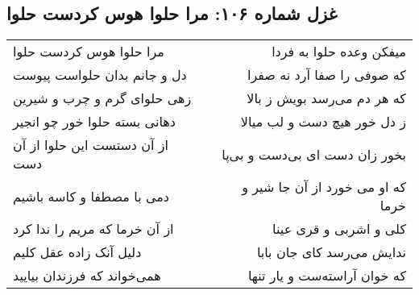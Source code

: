 \begin{center}
\section*{غزل شماره ۱۰۶: مرا حلوا هوس کردست حلوا}
\label{sec:0106}
\begin{longtable}{l p{0.5cm} r}
مرا حلوا هوس کردست حلوا
&&
میفکن وعده حلوا به فردا
\\
دل و جانم بدان حلواست پیوست
&&
که صوفی را صفا آرد نه صفرا
\\
زهی حلوای گرم و چرب و شیرین
&&
که هر دم می‌رسد بویش ز بالا
\\
دهانی بسته حلوا خور چو انجیر
&&
ز دل خور هیچ دست و لب میالا
\\
از آن دستست این حلوا از آن دست
&&
بخور زان دست ای بی‌دست و بی‌پا
\\
دمی با مصطفا و کاسه باشیم
&&
که او می خورد از آن جا شیر و خرما
\\
از آن خرما که مریم را ندا کرد
&&
کلی و اشربی و قری عینا
\\
دلیل آنک زاده عقل کلیم
&&
ندایش می‌رسد کای جان بابا
\\
همی‌خواند که فرزندان بیایید
&&
که خوان آراسته‌ست و یار تنها
\\
\end{longtable}
\end{center}
